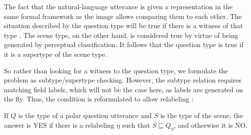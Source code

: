 The fact that the natural-language utterance is given a representation in the same formal framework as the image allows comparing them to each other.
The situation described by the question type will be true if there is a witness of that type \cite{BarwiseSituationsAttitudes1981,CooperAustiniantruthattitudes2005}.
The scene type, on the other hand, is considered true by virtue of being generated by perceptual classification.
It follows that the question type is true if it is a supertype of the scene type.

So rather than looking for a witness to the question type, we formulate the problem as subtype/supertype checking.
However, the subtype relation requires matching field labels, which will not be the case here, as labels are generated on the fly.
Thus, the condition is reformulated to allow relabeling \citep[pp. 133–135]{CooperTypetheorylanguage2016}:

If $Q$ is the type of a polar question utterance and $S$ is the type of the scene, the answer is YES if there is a relabeling $\eta$ such that $S \sqsubseteq Q_\eta$, and otherwise it is NO.






